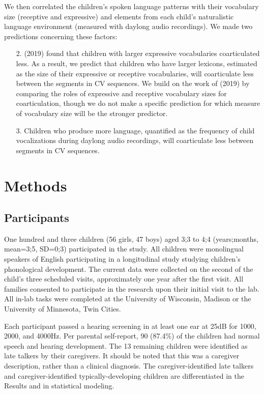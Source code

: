 \documentclass[a4paper,man,natbib,donotrepeattitle, apacite]{apa6}
\begin{document}
We then correlated the children’s spoken language patterns with their vocabulary size (receptive and expressive) and elements from each child’s naturalistic language environment (measured with daylong audio recordings). We made two predictions concerning these factors:

\begin{enumerate}
\item[2.] \citeauthor{noiraySpokenLanguageDevelopment2019} (2019) found that children with larger expressive vocabularies coarticulated less. As a result, we predict that children who have larger lexicons, estimated as the size of their expressive or receptive vocabularies, will coarticulate less between the segments in CV sequences. We build on the work of \citeauthor{noiraySpokenLanguageDevelopment2019} (2019) by comparing the roles of expressive and receptive vocabulary sizes for coarticulation, though we do not make a specific prediction for which measure of vocabulary size will be the stronger predictor.

\item[3.] Children who produce more language, quantified as the frequency of child vocalizations during daylong audio recordings, will coarticulate less between segments in CV sequences.
\end{enumerate}

\section{Methods}

\subsection{Participants}

One hundred and three children (56 girls, 47 boys) aged 3;3 to 4;4 (years;months, mean=3;5, SD=0;3) participated in the study. All children were monolingual speakers of English participating in a longitudinal study studying children’s phonological development. The current data were collected on the second of the child’s three scheduled visits, approximately one year after the first visit. All families consented to participate in the research upon their initial visit to the lab. All in-lab tasks were completed at the University of Wisconsin, Madison or the University of Minnesota, Twin Cities. 

Each participant passed a hearing screening in at least one ear at 25dB for 1000, 2000, and 4000Hz. Per parental self-report, 90 (87.4\%) of the children had normal speech and hearing development. The 13 remaining children were identified as late talkers by their caregivers. It should be noted that this was a caregiver description, rather than a clinical diagnosis. The caregiver-identified late talkers and caregiver-identified typically-developing children are differentiated in the Results and in statistical modeling. 
\end{document}
